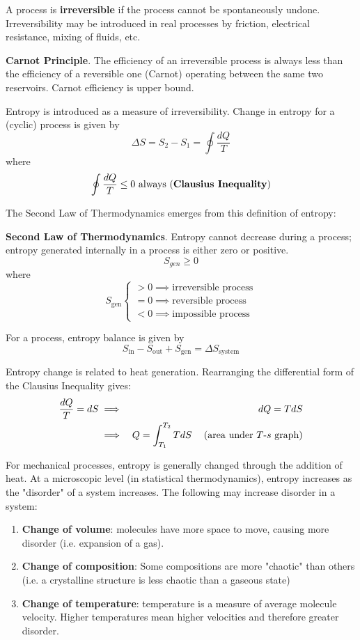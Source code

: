 A process is \textbf{irreversible} if the process cannot be spontaneously undone. Irreversibility may be introduced in real processes by friction, electrical resistance, mixing of fluids, etc.

\begin{shaded}
 \textbf{Carnot Principle}.
The efficiency of an irreversible process is always less than the efficiency of a reversible one (Carnot) operating between the same two reservoirs. Carnot efficiency is upper bound.
\end{shaded}

Entropy is introduced as a measure of irreversibility. Change in entropy for a (cyclic) process is given by \[\Delta S = S_2 - S_1 = \oint \frac{dQ}{T}\] where \[\oint \frac{d Q}{T}\leq 0\text{ always (\textbf{Clausius Inequality})}\] 

\newpage

The Second Law of Thermodynamics emerges from this definition of entropy: \begin{shaded}
     \textbf{Second Law of Thermodynamics}.
     Entropy cannot decrease during a process; entropy generated internally in a process is either zero or positive.
     \[S_{gen} \geq 0\] where \[S_\text{gen}\begin{cases}
        > 0 \implies \text{irreversible process}\\
        = 0 \implies \text{reversible process}\\
        < 0 \implies \text{impossible process}
     \end{cases}\]
 \end{shaded}

 For a process, entropy balance is given by \[S_\text{in} - S_\text{out} + S_\text{gen} = \Delta S_\text{system}\]

Entropy change is related to heat generation. Rearranging the differential form of the Clausius Inequality gives: \begin{eqnarray*}
    \frac{dQ}{T} = dS &\implies& dQ = TdS\\
    &\implies& Q = \int_{T_1}^{T_2} TdS\hspace{0.125in}\text{ (area under $T$-$s$ graph)}
\end{eqnarray*}

For mechanical processes, entropy is generally changed through the addition of heat. At a microscopic level (in statistical thermodynamics), entropy increases as the "disorder" of a system increases. The following may increase disorder in a system:
 \begin{enumerate}
     \item[] \textbf{Change of volume}: molecules have more space to move, causing more disorder (i.e. expansion of a gas). 
     \item[] \textbf{Change of composition}: Some compositions are more "chaotic" than others (i.e. a crystalline structure is less chaotic than a gaseous state)
     \item[] \textbf{Change of temperature}: temperature is a measure of average molecule velocity. Higher temperatures mean higher velocities and therefore greater disorder.
 \end{enumerate}

